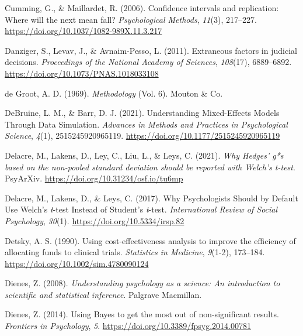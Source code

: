 \documentclass[
  oneside]{krantz}
\newlength{\cslhangindent}
\newlength{\cslentryspacingunit} %
\newenvironment{CSLReferences}[2] %
 {%
  \setlength{\parindent}{0pt}
  \ifodd #1
  \let\oldpar\par
  \def\par{\hangindent=\cslhangindent\oldpar}
  \fi
  \setlength{\parskip}{#2\cslentryspacingunit}
 }%
 {}
\begin{document}
\begin{CSLReferences}{1}{0}
\leavevmode{}%
Cumming, G., \& Maillardet, R. (2006). Confidence intervals and
replication: {Where} will the next mean fall? \emph{Psychological
Methods}, \emph{11}(3), 217--227.
\url{https://doi.org/10.1037/1082-989X.11.3.217}

\leavevmode{}%
Danziger, S., Levav, J., \& Avnaim-Pesso, L. (2011). Extraneous factors
in judicial decisions. \emph{Proceedings of the National Academy of
Sciences}, \emph{108}(17), 6889--6892.
\url{https://doi.org/10.1073/PNAS.1018033108}

\leavevmode{}%
de Groot, A. D. (1969). \emph{Methodology} (Vol. 6). {Mouton \& Co.}

\leavevmode{}%
DeBruine, L. M., \& Barr, D. J. (2021). Understanding {Mixed-Effects
Models Through Data Simulation}. \emph{Advances in Methods and Practices
in Psychological Science}, \emph{4}(1), 2515245920965119.
\url{https://doi.org/10.1177/2515245920965119}

\leavevmode{}%
Delacre, M., Lakens, D., Ley, C., Liu, L., \& Leys, C. (2021). \emph{Why
{Hedges}' g*s based on the non-pooled standard deviation should be
reported with {Welch}'s t-test}. {PsyArXiv}.
\url{https://doi.org/10.31234/osf.io/tu6mp}

\leavevmode{}%
Delacre, M., Lakens, D., \& Leys, C. (2017). Why {Psychologists Should}
by {Default Use Welch}'s {\emph{t}}-test {Instead} of {Student}'s
{\emph{t}}-test. \emph{International Review of Social Psychology},
\emph{30}(1). \url{https://doi.org/10.5334/irsp.82}

\leavevmode{}%
Detsky, A. S. (1990). Using cost-effectiveness analysis to improve the
efficiency of allocating funds to clinical trials. \emph{Statistics in
Medicine}, \emph{9}(1-2), 173--184.
\url{https://doi.org/10.1002/sim.4780090124}

\leavevmode{}%
Dienes, Z. (2008). \emph{Understanding psychology as a science: {An}
introduction to scientific and statistical inference}. {Palgrave
Macmillan}.

\leavevmode{}%
Dienes, Z. (2014). Using {Bayes} to get the most out of non-significant
results. \emph{Frontiers in Psychology}, \emph{5}.
\url{https://doi.org/10.3389/fpsyg.2014.00781}


\end{CSLReferences}
\end{document}
